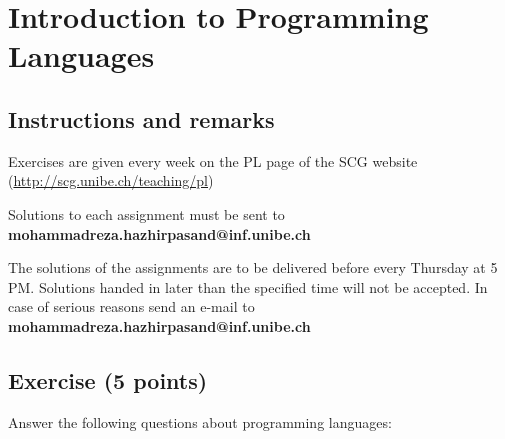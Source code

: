 \documentclass [11pt, a4wide, twoside]{article}
\begin{document}
\section*{\space{} Introduction to Programming Languages}


\subsection*{Instructions and remarks}
\begin{myitemize}
\item Exercises are given every week on the PL page of the SCG website \\ (\url{http://scg.unibe.ch/teaching/pl})
\item Solutions to each assignment must be sent to \textbf{mohammadreza.hazhirpasand@inf.unibe.ch}
\item The solutions of the assignments are to be delivered before every Thursday at 5 PM. Solutions handed in later than the specified time will not be accepted. In case of serious reasons send an e-mail to  \textbf{mohammadreza.hazhirpasand@inf.unibe.ch}
\end{myitemize}


\subsection*{Exercise (5 points)}
Answer the following questions about programming languages:
\end{document}
